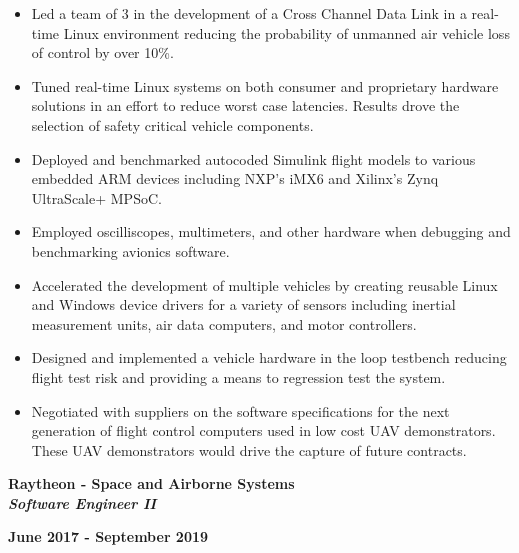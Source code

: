 \documentclass[11pt,letterpaper]{article}
\begin{document}
\begin{itemize}[noitemsep,topsep=0pt]
	\setlength\itemsep{0.2em}
	\item Led a team of 3 in the development of a Cross Channel Data Link in
	      a real-time Linux environment reducing the probability of unmanned
	      air vehicle loss of control by over 10\%.
	\item Tuned real-time Linux systems on both consumer and proprietary
	      hardware solutions in an effort to reduce worst case latencies.
	      Results drove the selection of safety critical vehicle components.
	\item Deployed and benchmarked autocoded Simulink flight models to
	      various embedded ARM devices including NXP's iMX6 and Xilinx's Zynq
	      UltraScale+ MPSoC.
	\item Employed oscilliscopes, multimeters, and other hardware when
	      debugging and benchmarking avionics software.
	\item Accelerated the development of multiple vehicles by creating
	      reusable Linux and Windows device drivers for a variety of sensors
	      including inertial measurement units, air data computers, and motor
	      controllers.
	\item Designed and implemented a vehicle hardware in the loop testbench
	      reducing flight test risk and providing a means to regression
	      test the system.
	\item Negotiated with suppliers on the software specifications for the next
	      generation of flight control computers used in low cost UAV
	      demonstrators. These UAV demonstrators would drive the capture of
	      future contracts.
\end{itemize}

\medskip

\begin{minipage}[t]{0.53\textwidth}
	\begin{flushleft}
		\textbf{Raytheon - Space and Airborne Systems}\\
		\textbf{\textit{Software Engineer II}}\\
	\end{flushleft}
\end{minipage}
\begin{minipage}[t]{0.43\textwidth}
	\begin{flushright}
		\textbf{June 2017 - September 2019}
	\end{flushright}
\end{minipage}
\end{document}
